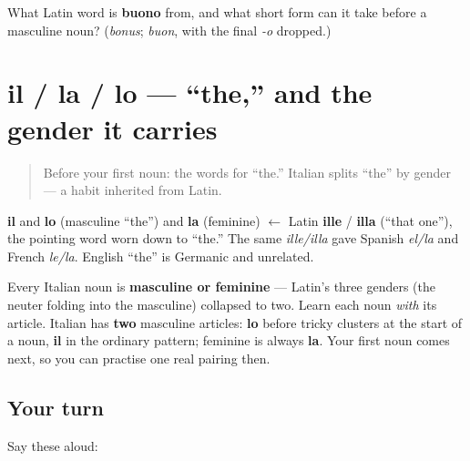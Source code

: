 \begin{tcolorbox}[breakable,colback=teal!4,colframe=teal!35!black,title={Before you move on}]
What Latin word is \textbf{buono} from, and what short form can it take before a masculine noun? (\emph{bonus}; \emph{buon}, with the final \emph{-o} dropped.)
\end{tcolorbox}
\section[il / la / lo]{il / la / lo — \textquotedblleft{}the,\textquotedblright{} and the gender it carries}

\label{lesson:IT-C01-il-la-lo}



\begin{quote}
Before your first noun: the words for \textquotedblleft{}the.\textquotedblright{} Italian splits \textquotedblleft{}the\textquotedblright{} by gender — a habit inherited from Latin.
\end{quote}

\begin{cousinweb}
\textbf{il} and \textbf{lo} (masculine \textquotedblleft{}the\textquotedblright{}) and \textbf{la} (feminine) $\leftarrow$ Latin \textbf{ille} / \textbf{illa} (\textquotedblleft{}that one\textquotedblright{}), the pointing word worn down to \textquotedblleft{}the.\textquotedblright{} The same \emph{ille/illa} gave Spanish \emph{el/la} and French \emph{le/la}. English \textquotedblleft{}the\textquotedblright{} is Germanic and unrelated.
\end{cousinweb}

\begin{grammarlens}[title={Grammar Lens: gender, and two masculine \textquotedblleft{}the\textquotedblright{}s}]
Every Italian noun is \textbf{masculine or feminine} — Latin's three genders (the neuter folding into the masculine) collapsed to two. Learn each noun \emph{with} its article. Italian has \textbf{two} masculine articles: \textbf{lo} before tricky clusters at the start of a noun, \textbf{il} in the ordinary pattern; feminine is always \textbf{la}. Your first noun comes next, so you can practise one real pairing then.
\end{grammarlens}

\subsection*{Your turn}
Say these aloud:

